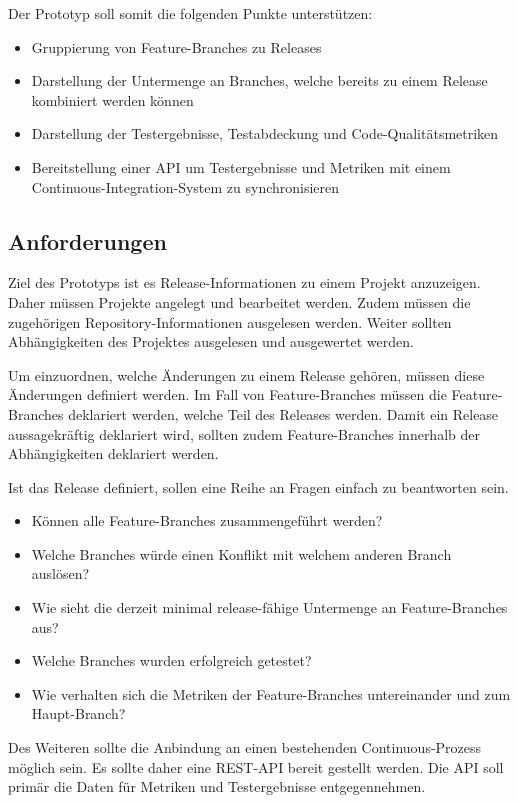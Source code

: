 Der Prototyp soll somit die folgenden Punkte unterstützen:
\begin{itemize}
\item Gruppierung von Feature-Branches zu Releases
\item Darstellung der Untermenge an Branches, welche bereits zu einem Release kombiniert werden können
\item Darstellung der Testergebnisse, Testabdeckung und Code-Qualitätsmetriken
\item Bereitstellung einer API um Testergebnisse und Metriken mit einem Continuous-Integration-System zu synchronisieren
\end{itemize}

\subsection{Anforderungen}

Ziel des Prototyps ist es Release-Informationen zu einem Projekt anzuzeigen. Daher müssen Projekte angelegt und bearbeitet werden. Zudem müssen die zugehörigen Repository-Informationen ausgelesen werden. Weiter sollten Abhängigkeiten des Projektes ausgelesen und ausgewertet werden. 

Um einzuordnen, welche Änderungen zu einem Release gehören, müssen diese Änderungen definiert werden. Im Fall von Feature-Branches müssen die Feature-Branches deklariert werden, welche Teil des Releases werden. Damit ein Release aussagekräftig deklariert wird, sollten zudem Feature-Branches innerhalb der Abhängigkeiten deklariert werden.

Ist das Release definiert, sollen eine Reihe an Fragen einfach zu beantworten sein. 
\begin{itemize}
\item Können alle Feature-Branches zusammengeführt werden?
\item Welche Branches würde einen Konflikt mit welchem anderen Branch auslösen?
\item Wie sieht die derzeit minimal release-fähige Untermenge an Feature-Branches aus?
\item Welche Branches wurden erfolgreich getestet?
\item Wie verhalten sich die Metriken der Feature-Branches untereinander und zum Haupt-Branch?
\end{itemize}

Des Weiteren sollte die Anbindung an einen bestehenden Continuous-Prozess möglich sein. Es sollte daher eine REST-API bereit gestellt werden. Die API soll primär die Daten für Metriken und Testergebnisse entgegennehmen.


